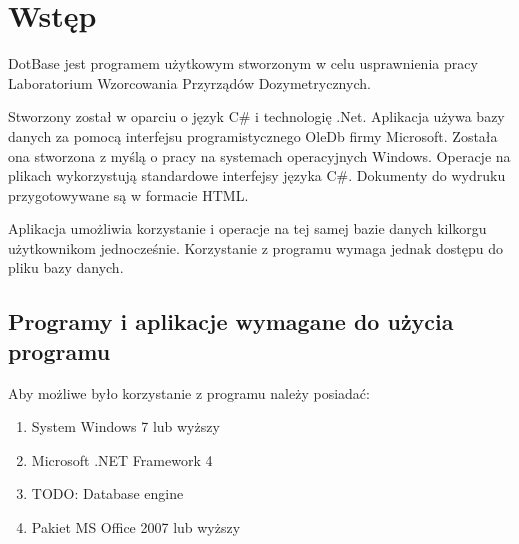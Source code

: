 
\rozdzial


\section{Wstęp}

DotBase jest programem użytkowym stworzonym w celu usprawnienia pracy Laboratorium Wzorcowania Przyrządów Dozymetrycznych.

Stworzony został w oparciu o język C\# i technologię .Net. Aplikacja używa bazy danych za pomocą interfejsu programistycznego OleDb firmy Microsoft. Została ona stworzona z myślą o pracy na systemach operacyjnych Windows. Operacje na plikach wykorzystują standardowe interfejsy języka C\#. Dokumenty do wydruku przygotowywane są w formacie HTML.

Aplikacja umożliwia korzystanie i operacje na tej samej bazie danych kilkorgu użytkownikom jednocześnie. Korzystanie z programu wymaga jednak dostępu do pliku bazy danych.

\subsection{Programy i aplikacje wymagane do użycia programu}

Aby możliwe było korzystanie z programu należy posiadać:
\begin{enumerate}
	\item System Windows 7 lub wyższy
	\item Microsoft .NET Framework 4 	
	\item TODO: Database engine
	\item Pakiet MS Office 2007 lub wyższy
\end{enumerate}

